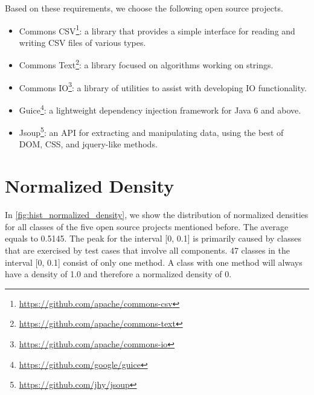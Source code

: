     
    
    

Based on these requirements, we choose the following open source projects.

\begin{itemize}[noitemsep]
    \item Commons CSV\footnote{\url{https://github.com/apache/commons-csv}}: a library that provides a simple interface for reading and writing CSV files of various types.
    \item Commons Text\footnote{\url{https://github.com/apache/commons-text}}: a library focused on algorithms working on strings.
    \item Commons IO\footnote{\url{https://github.com/apache/commons-io}}: a library of utilities to assist with developing IO functionality.
    \item Guice\footnote{\url{https://github.com/google/guice}}: a lightweight dependency injection framework for Java 6 and above.
    \item Jsoup\footnote{\url{https://github.com/jhy/jsoup}}: an API for extracting and manipulating data, using the best of DOM, CSS, and jquery-like methods.
\end{itemize}



\section{Normalized Density}

In \autoref{fig:hist_normalized_density}, we show the distribution of normalized densities for all classes of the five open source projects mentioned before.
The average equals to 0.5145.
The peak for the interval [0, 0.1] is primarily caused by classes that are exercised by test cases that involve all components.
47 classes in the interval [0, 0.1] consist of only one method.
A class with one method will always have a density of 1.0 and therefore a normalized density of 0.
    
